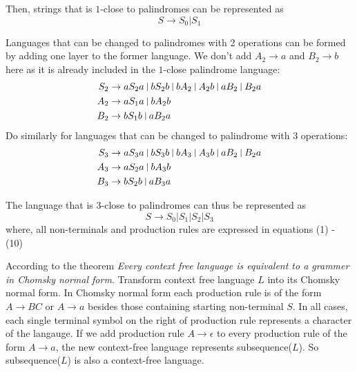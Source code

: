 \documentclass[12pt,a4paper]{article}
\newcommand{\question}[1]{\bigskip\noindent{\textbf{Q{#1} solution}}}
\begin{document}
Then, strings that is $1$-close to palindromes can be represented as  
$$
  S \rightarrow S_0 | S_1
$$

Languages that can be changed to palindromes with 2 operations can be formed by adding one layer to the former language. We don't add $A_2\rightarrow a$ and $B_2\rightarrow b$ here as it is already included in the $1$-close palindrome language:
\begin{align}
  S_2 & \rightarrow aS_2a\ \vline\ bS_2b\ \vline\ bA_2\ \vline\ A_2b\  \vline\ aB_2\ \vline\ B_2a \\
  A_2 &\rightarrow aS_1a\ \vline\ bA_2b \\
  B_2 &\rightarrow bS_1b\ \vline\ aB_2a
\end{align}
Do similarly for languages that can be changed to palindrome with 3 operations:
\begin{align}
  S_3 & \rightarrow aS_3a\ \vline\ bS_3b\ \vline\ bA_3\ \vline\ A_3b\  \vline\ aB_2\ \vline\ B_2a \\
  A_3 &\rightarrow aS_2a\ \vline\ bA_3b \\
  B_3 &\rightarrow bS_2b\ \vline\ aB_3a
\end{align}

The language that is 3-close to palindromes can thus be represented as
$$
  S \rightarrow S_0 | S_1 | S_2 | S_3
$$
where, all non-terminals and production rules are expressed in equations (1) - (10)



\question{12.B}

According to the theorem {\em Every context free language is equivalent to a grammer in Chomsky normal form}\cite{model}. Transform context free language $L$ into its Chomsky normal form. In Chomsky normal form each production rule is of the form $A\rightarrow BC \mbox{ or } A\rightarrow a$ besides those containing starting non-terminal $S$. In all cases, each single terminal symbol on the right of production rule represents a character of the langauge. If we add production rule $A\rightarrow \epsilon$ to every production rule of the form $A\rightarrow a$, the new context-free language represents subsequence($L$). So subsequence($L$) is also a context-free language.




\end{document}
